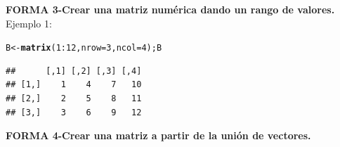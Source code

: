 \documentclass[12pt,letterpaper]{article}\usepackage[]{graphicx}\usepackage[]{color}
\makeatletter
\newcommand{\hlnum}[1]{\textcolor[rgb]{0.686,0.059,0.569}{#1}}%
\newcommand{\hlopt}[1]{\textcolor[rgb]{0,0,0}{#1}}%
\newcommand{\hlstd}[1]{\textcolor[rgb]{0.345,0.345,0.345}{#1}}%
\newcommand{\hlkwb}[1]{\textcolor[rgb]{0.69,0.353,0.396}{#1}}%
\newcommand{\hlkwc}[1]{\textcolor[rgb]{0.333,0.667,0.333}{#1}}%
\newcommand{\hlkwd}[1]{\textcolor[rgb]{0.737,0.353,0.396}{\textbf{#1}}}%
\newenvironment{kframe}{%
 \def\at@end@of@kframe{}%
 \ifinner\ifhmode%
  \def\at@end@of@kframe{\end{minipage}}%
  \begin{minipage}{\columnwidth}%
 \fi\fi%
 \def\FrameCommand##1{\hskip\@totalleftmargin \hskip-\fboxsep
 \colorbox{shadecolor}{##1}\hskip-\fboxsep
     \hskip-\linewidth \hskip-\@totalleftmargin \hskip\columnwidth}%
 \MakeFramed {\advance\hsize-\width
   \@totalleftmargin\z@ \linewidth\hsize
   \@setminipage}}%
 {\par\unskip\endMakeFramed%
 \at@end@of@kframe}
\newenvironment{knitrout}{}{} %
\makeatother
\begin{document}
\textbf{FORMA 3-Crear una matriz num\'erica dando un rango de valores.}\\

Ejemplo 1:
\begin{knitrout}
\color{fgcolor}\begin{kframe}
\begin{alltt}
\hlstd{B} \hlkwb{<-} \hlkwd{matrix}\hlstd{(}\hlnum{1}\hlopt{:}\hlnum{12}\hlstd{,} \hlkwc{nrow}\hlstd{=}\hlnum{3}\hlstd{,} \hlkwc{ncol}\hlstd{=}\hlnum{4}\hlstd{); B}
\end{alltt}
\begin{verbatim}
##      [,1] [,2] [,3] [,4]
## [1,]    1    4    7   10
## [2,]    2    5    8   11
## [3,]    3    6    9   12
\end{verbatim}
\end{kframe}
\end{knitrout}

\textbf{FORMA 4-Crear una matriz a partir de la uni\'on de vectores.}\\
\end{document}
